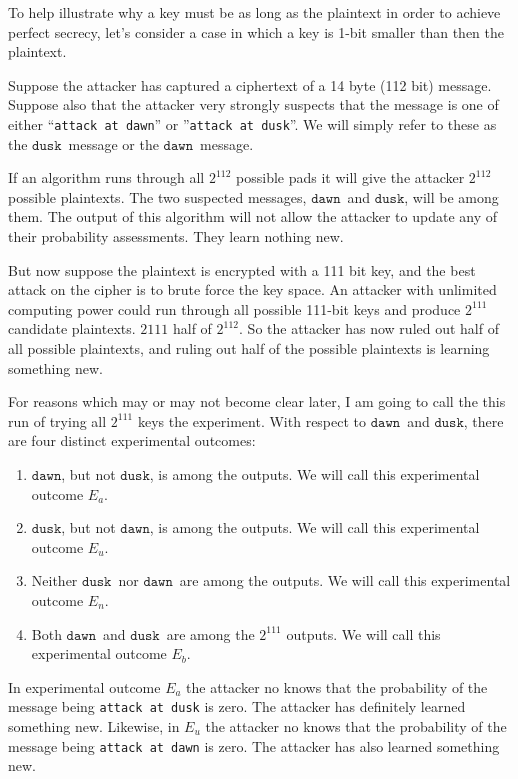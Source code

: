 \documentclass{article}
\newcommand\mdusk{\ensuremath{\mathtt{dusk}}}
\newcommand\mdawn{\ensuremath{\mathtt{dawn}}}
\begin{document}
To help illustrate why a key must be as long as the plaintext in order to achieve perfect secrecy, let's consider a case in which a key is 1-bit smaller than then the plaintext.

Suppose the attacker has captured a ciphertext of a 14 byte (112 bit) message.
Suppose also that the attacker very strongly suspects that the message is one of either “\texttt{attack at dawn}” or ”\texttt{attack at dusk}”.
We will simply refer to these as the \mdusk\ message or the \mdawn\ message.

If an algorithm runs through all $2^{112}$ possible pads it will give the attacker $2^{112}$ possible plaintexts.
The two suspected messages, \mdawn\ and \mdusk, will be among them.
The output of this algorithm will not allow the attacker to update any of their probability assessments. They learn nothing new.

But now suppose the plaintext is encrypted with a 111 bit key, and the best attack on the cipher is to brute force the key space.
An attacker with unlimited computing power could run through all possible 111-bit keys and produce $2^{111}$ candidate plaintexts.
$2{111}$ half of $2^{112}$.
So the attacker has now ruled out half of all possible plaintexts,
and ruling out half of the possible plaintexts is learning something new.

For reasons which may or may not become clear later, I am going to call the this run of trying all $2^{111}$ keys the experiment. 
With respect to \mdawn\ and \mdusk, there are four distinct experimental outcomes:

\begin{enumerate}
    \item\label{en:dawn} \mdawn, but not \mdusk, is among the outputs.
        We will call this experimental outcome $E_a$.
    \item\label{en:dusk} \mdusk, but not \mdawn, is among the outputs.
        We will call this experimental outcome $E_u$.
    \item\label{en:neither} Neither \mdusk\ nor \mdawn\ are among the outputs.
    We will call this experimental outcome $E_n$.
    \item\label{en:both} Both \mdawn\ and \mdusk\ are among the $2^{111}$ outputs.
    We will call this experimental outcome $E_b$.
\end{enumerate}

In experimental outcome $E_a$ the attacker no knows that the probability of the message being \texttt{attack at dusk} is zero.
The attacker has definitely learned something new.
Likewise, in $E_u$ the attacker no knows that the probability of the message being \texttt{attack at dawn} is zero.
The attacker has also learned something new.
\end{document}
